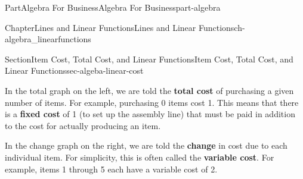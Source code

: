 \documentclass[oneside,10pt,]{tufte-book}
\newcommand{\terminology}[1]{\textbf{#1}}
\numberwithin{equation}{chapter}
\def \tikzhistogram (#1,#2){\draw[fill=blue,opacity=0.3] ({#1+((\xtwo-\xmin)/5)},#2) rectangle ({#1-((\xtwo-\xmin)/5)},0); \draw[draw,thick] ({#1+((\xtwo-\xmin)/5)},#2) rectangle ({#1-((\xtwo-\xmin)/5)},0); \node[draw,fill=blue, circle,inner sep=2.5pt] at (#1,#2) {};}
\begin{document}
\begin{partptx}{Part}{Algebra For Business}{}{Algebra For Business}{}{}{part-algebra}
\begin{chapterptx}{Chapter}{Lines and Linear Functions}{}{Lines and Linear Functions}{}{}{ch-algebra_linearfunctions}
\begin{sectionptx}{Section}{Item Cost, Total Cost, and Linear Functions}{}{Item Cost, Total Cost, and Linear Functions}{}{}{sec-algeba-linear-cost}
\begin{image}{0.125}{0.75}{0.125}{}
{\begin{tikzpicture}[xscale=\xscale,yscale=\yscale]


\end{tikzpicture}
\quad
{}
}%
\end{image}%
In the total graph on the left, we are told the \terminology{total cost} of purchasing a given number of items. For example, purchasing 0 items cost \textdollar{}1. This means that there is a \terminology{fixed cost} of \textdollar{}1 (to set up the assembly line) that must be paid in addition to the cost for actually producing an item.%
\par
In the change graph on the right, we are told the \terminology{change} in cost due to each individual item. For simplicity, this is often called the \terminology{variable cost}. For example, items 1 through 5 each have a variable cost of \textdollar{}2.%

\end{sectionptx}
\end{chapterptx}
\end{partptx}
\end{document}
